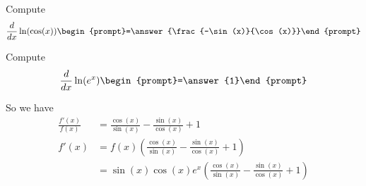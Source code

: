 \documentclass{ximera}
\begin{document}
\begin{problem}
  Compute %
  \[
  \ddx \ln(\cos(x))  \begin{prompt}=\answer{\frac{-\sin(x)}{\cos(x)}}\end{prompt}
  \]
\end{problem}

\begin{problem}
  Compute %
  \[
  \ddx \ln(e^x)  \begin{prompt}=\answer{1}\end{prompt}
  \]
\end{problem}

So we have
\begin{align*}
  \frac{f'(x)}{f(x)} &= \frac{\cos(x)}{\sin(x)} - \frac{\sin(x)}{\cos(x)} + 1\\
  f'(x) &= f(x) \left(\frac{\cos(x)}{\sin(x)} - \frac{\sin(x)}{\cos(x)} + 1\right)\\
  &= \sin(x)\cos(x)e^x\left(\frac{\cos(x)}{\sin(x)} - \frac{\sin(x)}{\cos(x)} + 1\right)
\end{align*}



%
\end{document}
